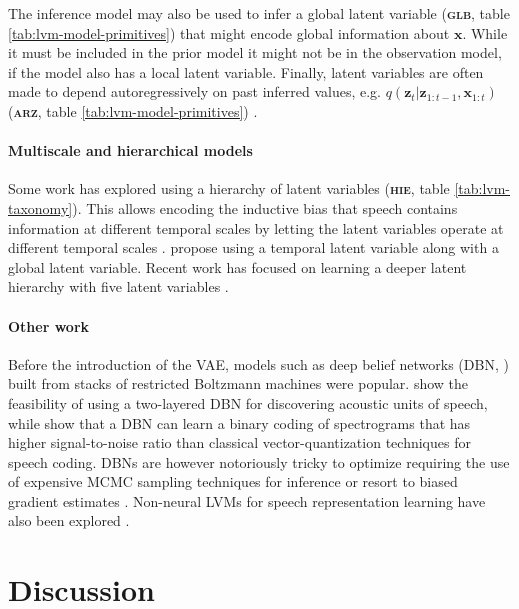 {The inference model may also be used to infer a global latent variable (\textbf{\textsc{glb}}, table \ref{tab:lvm-model-primitives}) that might encode global information about $\mathbf{x}$. 
While it must be included in the prior model it might not be in the observation model, if the model also has a local latent variable. 
Finally, latent variables are often made to depend autoregressively on past inferred values, e.g. $q(\mathbf{z}_t|\mathbf{z}_{1:t-1},\mathbf{x}_{1:t})$ (\textbf{\textsc{arz}}, table \ref{tab:lvm-model-primitives}) \cite{chung_recurrent_2015, fraccaro_sequential_2016}.

\paragraph{Multiscale and hierarchical models} 
Some work has explored using a hierarchy of latent variables (\textbf{\textsc{hie}}, table \ref{tab:lvm-taxonomy}). This allows encoding the inductive bias that speech contains information at different temporal scales by letting the latent variables operate at different temporal scales \cite{hsu_unsupervised_2017}. \citet{khurana_factorial_2019} propose using a temporal latent variable along with a global latent variable. 
Recent work has focused on learning a deeper latent hierarchy with five latent variables \cite{aksan_stcn_2019}. 

\paragraph{Other work}
Before the introduction of the VAE, models such as deep belief networks (DBN, \citealp{hinton_fast_2006}) built from stacks of restricted Boltzmann machines \cite{smolensky_chapter_1986,fischer_training_2014} were popular. \citet{lee_unsupervised_2009} show the feasibility of using a two-layered DBN for discovering acoustic units of speech, while \citet{deng_binary_2010} show that a DBN can learn a binary coding of spectrograms that has higher signal-to-noise ratio than classical vector-quantization techniques for speech coding.
DBNs are however notoriously tricky to optimize requiring the use of expensive MCMC sampling techniques for inference or resort to biased gradient estimates \cite{montavon_practical_2012,fischer_bounding_2011}.
Non-neural LVMs for speech representation learning have also been explored
\cite{lee_nonparametric_2012, ondel_variational_2016, heck_feature_2017, jansen_weak_2013}.


\section{Discussion}
\label{sec:mtax}

}
